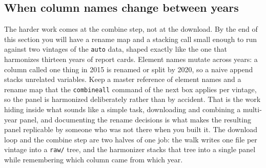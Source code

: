 \documentclass[
    a4paper,
    fontsize=10pt,
    twoside=true,
    numbers=noenddot,
]{kaobook}
\begin{document}
\subsection{When column names change between years}\label{sec:ch04-combine}
The harder work comes at the combine step, not at the download. By the end of this section you will have a rename map and a stacking call small enough to run against two vintages of the \texttt{auto} data, shaped exactly like the one that harmonizes thirteen years of report cards. Element names mutate across years: a column called one thing in 2015 is renamed or split by 2020, so a naive append stacks unrelated variables. Keep a master reference of element names and a rename map that the \texttt{combineall} command of the next box applies per vintage, so the panel is harmonized deliberately rather than by accident. That is the work hiding inside what sounds like a simple task, downloading and combining a multi-year panel, and documenting the rename decisions is what makes the resulting panel replicable by someone who was not there when you built it. The download loop and the combine step are two halves of one job: the walk writes one file per vintage into a \texttt{raw/} tree, and the harmonizer stacks that tree into a single panel while remembering which column came from which year.
\end{document}
